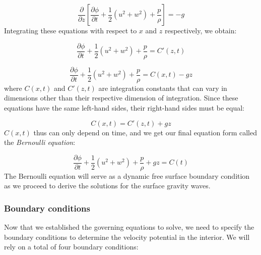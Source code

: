 \documentclass[12pt]{article}
\numberwithin{equation}{section}
\numberwithin{figure}{section}
\numberwithin{table}{section}
\begin{document}
\begin{equation}
  \frac{\partial}{\partial z} \left[
    \frac{\partial \phi}{\partial t} +
    \frac{1}{2} \left(u^2 + w^2\right) +
    \frac{p}{\rho}
  \right] = -g
\end{equation}
Integrating these equations with respect to $x$ and $z$ respectively, we obtain:

\begin{equation}
  \frac{\partial \phi}{\partial t} +
  \frac{1}{2} \left(u^2 + w^2\right) +
  \frac{p}{\rho} = C'(z, t)
\end{equation}

\begin{equation}
  \frac{\partial \phi}{\partial t} +
  \frac{1}{2} \left(u^2 + w^2\right) +
  \frac{p}{\rho} = C(x, t) - gz
\end{equation}
where $C(x, t)$ and $C'(z, t)$ are integration constants that can vary in
dimensions other than their respective dimension of integration.
Since these equations have the same left-hand sides, their right-hand sides must
be equal:

\begin{equation}
  C(x, t) = C'(z, t) + gz
\end{equation}
$C(x, t)$ thus can only depend on time, and we get our final equation form
called the \textit{Bernoulli equation}:

\begin{equation}
  \frac{\partial \phi}{\partial t} +
  \frac{1}{2} \left(u^2 + w^2\right) +
  \frac{p}{\rho} + gz= C(t)
  \label{eq:bernoulli}
\end{equation}
The Bernoulli equation will serve as a dynamic free surface boundary condition
as we proceed to derive the solutions for the surface gravity waves.

\subsubsection{Boundary conditions}
\label{sec:boundary_conditions}

Now that we established the governing equations to solve, we need to specify the
boundary conditions to determine the velocity potential in the interior.
We will rely on a total of four boundary conditions:
\end{document}
